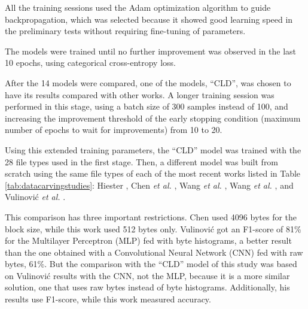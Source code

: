 


All the training sessions used the Adam \cite{kingma_adam:_2014}
optimization algorithm to guide backpropagation, which was selected because it showed good learning speed in the preliminary tests without requiring fine-tuning of parameters.

The models were trained until no further improvement was observed in the last 10 epochs, using categorical cross-entropy loss.

After the 14 models were compared, one of the models, ``CLD'', was chosen to have its results compared with other works. A longer training session was performed in this stage, using a batch size of 300 samples instead of 100, and increasing the improvement threshold of the early stopping condition (maximum number of epochs to wait for improvements) from 10 to 20.

Using this extended training parameters, the ``CLD'' model was trained with the 28 file types used in the first stage. Then, a different model was built from scratch using the same file types of each of the most recent works listed in Table \ref{tab:datacarvingstudies}: 
Hiester \cite{hiester_file_2018}, 
Chen \textit{et al.} \cite{chen_file_2018},
Wang \textit{et al.} \cite{wang_sparse_2018},
Wang \textit{et al.} \cite{wang_file_2018},
and
Vulinović \textit{et al.} \cite{vulinovic_neural_2019}.

This comparison has three important restrictions.
Chen used 4096 bytes for the block size, while this work used 512 bytes only.
Vulinović got an F1-score of 81\% for the Multilayer Perceptron (MLP) fed with byte histograms, a better result than the one obtained with a Convolutional Neural Network (CNN) fed with raw bytes, 61\%. But the comparison with the ``CLD'' model of this study was based on Vulinović results with the CNN, not the MLP, because it is a more similar solution, one that uses raw bytes instead of byte histograms. Additionally, his results use F1-score, while this work measured accuracy. 

